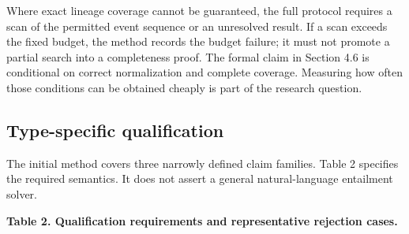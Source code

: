 Where exact lineage coverage cannot be guaranteed, the full protocol
requires a scan of the permitted event sequence or an unresolved result.
If a scan exceeds the fixed budget, the method records the budget
failure; it must not promote a partial search into a completeness proof.
The formal claim in Section 4.6 is conditional on correct normalization
and complete coverage. Measuring how often those conditions can be
obtained cheaply is part of the research question.

\subsection{Type-specific
qualification}\label{type-specific-qualification}

The initial method covers three narrowly defined claim families. Table 2
specifies the required semantics. It does not assert a general
natural-language entailment solver.


\textbf{Table 2. Qualification requirements and representative rejection
cases.}

